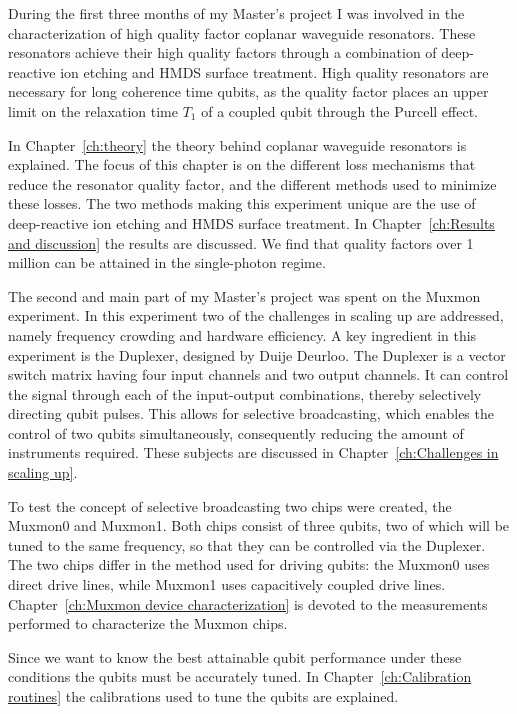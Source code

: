 \documentclass[12pt]{report}
\begin{document}
  During the first three months of my Master's project I was involved in the characterization of high quality factor coplanar waveguide resonators. These resonators achieve their high quality factors through a combination of deep-reactive ion etching and HMDS surface treatment. High quality resonators are necessary for long coherence time qubits, as the quality factor places an upper limit on the relaxation time $T_1$ of a coupled qubit through the Purcell effect.

  In Chapter~\ref{ch:theory} the theory behind coplanar waveguide resonators is explained. The focus of this chapter is on the different loss mechanisms that reduce the resonator quality factor, and the different methods used to minimize these losses. The two methods making this experiment unique are the use of deep-reactive ion etching and HMDS surface treatment. In Chapter~\ref{ch:Results and discussion} the results are discussed. We find that quality factors over 1 million can be attained in the single-photon regime.

  The second and main part of my Master's project was spent on the Muxmon experiment. In this experiment two of the challenges in scaling up are addressed, namely frequency crowding and hardware efficiency. A key ingredient in this experiment is the Duplexer, designed by Duije Deurloo. The Duplexer is a vector switch matrix having four input channels and two output channels. It can control the signal through each of the input-output combinations, thereby selectively directing qubit pulses. This allows for selective broadcasting, which enables the control of two qubits simultaneously, consequently reducing the amount of instruments required. These subjects are discussed in Chapter~\ref{ch:Challenges in scaling up}.

  To test the concept of selective broadcasting two chips were created, the Muxmon0 and Muxmon1. Both chips consist of three qubits, two of which will be tuned to the same frequency, so that they can be controlled via the Duplexer. The two chips differ in the method used for driving qubits: the Muxmon0 uses direct drive lines, while Muxmon1 uses capacitively coupled drive lines. Chapter~\ref{ch:Muxmon device characterization} is devoted to the measurements performed to characterize the Muxmon chips.

  Since we want to know the best attainable qubit performance under these conditions the qubits must be accurately tuned. In Chapter~\ref{ch:Calibration routines} the calibrations used to tune the qubits are explained.
\end{document}
